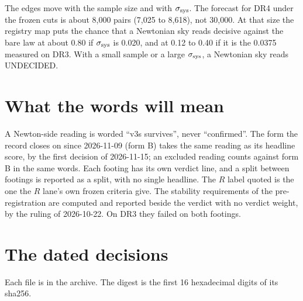 \documentclass[10pt]{article}
\begin{document}
The edges move with the sample size and with $\sigma_{\rm sys}$. The forecast for DR4 under the frozen cuts is about 8,000 pairs (7,025 to 8,618), not 30,000.
At that size the registry map puts the chance that a Newtonian sky reads decisive against the bare law at about 0.80 if $\sigma_{\rm sys}$ is 0.020, and at 0.12 to 0.40 if it is the 0.0375 measured on DR3.
With a small sample or a large $\sigma_{\rm sys}$, a Newtonian sky reads UNDECIDED.

\section{What the words will mean}
A Newton-side reading is worded ``v3s survives'', never ``confirmed''.
The form the record closes on since 2026-11-09 (form B) takes the same reading as its headline score, by the first decision of 2026-11-15; an excluded reading counts against form B in the same words.
Each footing has its own verdict line, and a split between footings is reported as a split, with no single headline.
The $R$ label quoted is the one the $R$ lane's own frozen criteria give.
The stability requirements of the pre-registration are computed and reported beside the verdict with no verdict weight, by the ruling of 2026-10-22. On DR3 they failed on both footings.

\section{The dated decisions}
Each file is in the archive. The digest is the first 16 hexadecimal digits of its sha256.
\end{document}
